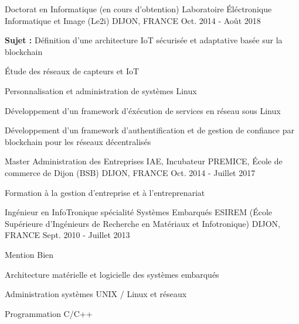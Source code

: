 

\begin{cventries}

  \cventry
    {Doctorat en Informatique (en cours d'obtention)} %
    {Laboratoire \'Eléctronique Informatique et Image (Le2i)} %
    {DIJON, FRANCE} %
    {Oct. 2014 - Août 2018} %
    {
      \begin{cvitems} %
      \item {\textbf{Sujet : }Définition d'une architecture IoT sécurisée et adaptative basée sur la blockchain}
      \item {\'Etude des réseaux de capteurs et IoT}
      \item {Personnalisation et administration de systèmes Linux}
      \item {Développement d'un framework d'éxécution de services en réseau sous Linux}
      \item {Développement d'un framework d'authentification et de gestion de confiance par blockchain pour les réseaux décentralisés}
      \end{cvitems}
    }

  \cventry
    {Master Administration des Entreprises} %
    {IAE, Incubateur PREMICE, \'Ecole de commerce de Dijon (BSB)} %
    {DIJON, FRANCE} %
    {Oct. 2014 - Juillet 2017} %
    {
      \begin{cvitems} %
      \item {Formation à la gestion d'entreprise et à l'entreprenariat}
      \end{cvitems}
    }

  \cventry
    {Ingénieur en InfoTronique spécialité Systèmes Embarqués} %
    {ESIREM (\'Ecole Supérieure d'Ingénieurs de Recherche en Matériaux et Infotronique)} %
    {DIJON, FRANCE} %
    {Sept. 2010 - Juillet 2013} %
    {
      \begin{cvitems} %
      \item {Mention Bien}
      \item {Architecture matérielle et logicielle des systèmes embarqués}
      \item {Administration systèmes UNIX / Linux et réseaux}
      \item {Programmation C/C++}
      \end{cvitems}
    }


\end{cventries}
